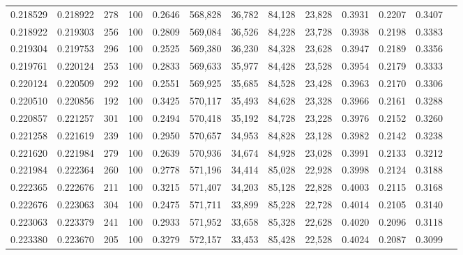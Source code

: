 \begin{tabular}{rrrrrrrrrrrrr}
0.218529 & 0.218922 &   278 & 100 &                                     0.2646 & 568,828 &  36,782 &  84,128 &  23,828 & 0.3931 & 0.2207 & 0.3407 \\
0.218922 & 0.219303 &   256 & 100 &                                     0.2809 & 569,084 &  36,526 &  84,228 &  23,728 & 0.3938 & 0.2198 & 0.3383 \\
0.219304 & 0.219753 &   296 & 100 &                                     0.2525 & 569,380 &  36,230 &  84,328 &  23,628 & 0.3947 & 0.2189 & 0.3356 \\
0.219761 & 0.220124 &   253 & 100 &                                     0.2833 & 569,633 &  35,977 &  84,428 &  23,528 & 0.3954 & 0.2179 & 0.3333 \\
0.220124 & 0.220509 &   292 & 100 &                                     0.2551 & 569,925 &  35,685 &  84,528 &  23,428 & 0.3963 & 0.2170 & 0.3306 \\
0.220510 & 0.220856 &   192 & 100 &                                     0.3425 & 570,117 &  35,493 &  84,628 &  23,328 & 0.3966 & 0.2161 & 0.3288 \\
0.220857 & 0.221257 &   301 & 100 &                                     0.2494 & 570,418 &  35,192 &  84,728 &  23,228 & 0.3976 & 0.2152 & 0.3260 \\
0.221258 & 0.221619 &   239 & 100 &                                     0.2950 & 570,657 &  34,953 &  84,828 &  23,128 & 0.3982 & 0.2142 & 0.3238 \\
0.221620 & 0.221984 &   279 & 100 &                                     0.2639 & 570,936 &  34,674 &  84,928 &  23,028 & 0.3991 & 0.2133 & 0.3212 \\
0.221984 & 0.222364 &   260 & 100 &                                     0.2778 & 571,196 &  34,414 &  85,028 &  22,928 & 0.3998 & 0.2124 & 0.3188 \\
0.222365 & 0.222676 &   211 & 100 &                                     0.3215 & 571,407 &  34,203 &  85,128 &  22,828 & 0.4003 & 0.2115 & 0.3168 \\
0.222676 & 0.223063 &   304 & 100 &                                     0.2475 & 571,711 &  33,899 &  85,228 &  22,728 & 0.4014 & 0.2105 & 0.3140 \\
0.223063 & 0.223379 &   241 & 100 &                                     0.2933 & 571,952 &  33,658 &  85,328 &  22,628 & 0.4020 & 0.2096 & 0.3118 \\
0.223380 & 0.223670 &   205 & 100 &                                     0.3279 & 572,157 &  33,453 &  85,428 &  22,528 & 0.4024 & 0.2087 & 0.3099 \\

\end{tabular}
